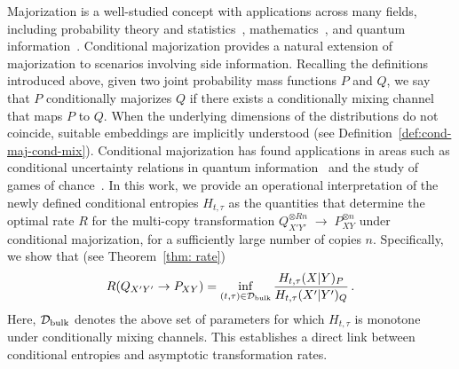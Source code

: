 \documentclass[aps,pra,11pt,onecolumn,nofootinbib,tightenlines]{revtex4-2}
\theoremstyle{definition}
\newcommand{\D}{\mathcal{D}}
\begin{document}
Majorization is a well-studied concept with applications across many fields, including probability theory and statistics~\cite{marshall1979inequalities}, mathematics~\cite{bhatia1997matrix}, and quantum information~\cite{nielsen1999conditions,horodecki2013fundamental}. Conditional majorization provides a natural extension of majorization to scenarios involving side information. Recalling the definitions introduced above, given two joint probability mass functions $P$ and $Q$, we say that $P$ conditionally majorizes $Q$ if there exists a conditionally mixing channel that maps $P$ to $Q$. When the underlying dimensions of the distributions do not coincide, suitable embeddings are implicitly understood (see Definition~\ref{def:cond-maj-cond-mix}).
Conditional majorization has found applications in areas such as conditional uncertainty relations in quantum information~\cite{gour2018conditional} and the study of games of chance~\cite{brandsen2022entropy}. 
In this work, we provide an operational interpretation of the newly defined conditional entropies $H_{t,\tau}$ as the quantities that determine the optimal rate $R$ for the multi-copy transformation $Q_{X'Y'}^{\otimes R n} \;\longrightarrow\;P_{XY}^{\otimes n}$
under conditional majorization, for a sufficiently large number of copies $n$. Specifically, we show that (see Theorem~\ref{thm: rate})
\begin{equation}
R(Q_{X'Y'} \rightarrow  P_{XY}) = \inf_{(t,\tau) \in \D_{\rm{bulk}}} \frac{H_{t,\tau}(X|Y)_P }{H_{t,\tau}(X'|Y')_Q} \,.
\end{equation}
Here, \(\D_{\rm{bulk}}\) denotes the above set of parameters for which \(H_{t,\tau}\) is monotone under conditionally mixing channels.
This establishes a direct link between conditional entropies and asymptotic transformation rates.

\medskip
\end{document}
